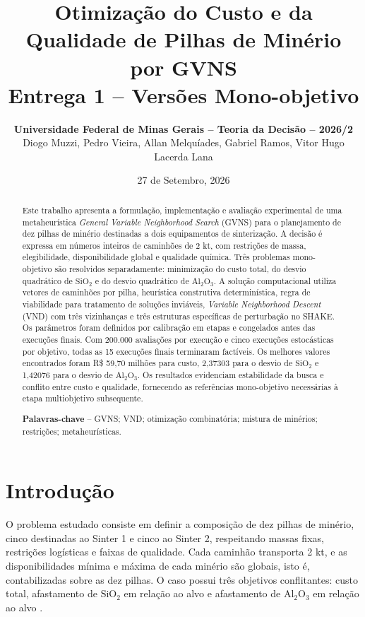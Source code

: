 \documentclass[10pt,twocolumn,a4paper]{article}
\title{\LARGE \textbf{Otimização do Custo e da Qualidade de Pilhas de Minério por GVNS}\\[0.3em]
\large Entrega 1 -- Versões Mono-objetivo}
\author{\textbf{Universidade Federal de Minas Gerais -- Teoria da Decisão -- 2026/2}\\[0.2em]
\small Diogo Muzzi, Pedro Vieira, Allan Melquíades, Gabriel Ramos, Vitor Hugo Lacerda Lana}
\date{27 de Setembro, 2026}
\begin{document}
\maketitle

\begin{abstract}
\noindent Este trabalho apresenta a formulação, implementação e avaliação experimental de uma metaheurística \textit{General Variable Neighborhood Search} (GVNS) para o planejamento de dez pilhas de minério destinadas a dois equipamentos de sinterização. A decisão é expressa em números inteiros de caminhões de 2 kt, com restrições de massa, elegibilidade, disponibilidade global e qualidade química. Três problemas mono-objetivo são resolvidos separadamente: minimização do custo total, do desvio quadrático de $\text{SiO}_2$ e do desvio quadrático de $\text{Al}_2\text{O}_3$. A solução computacional utiliza vetores de caminhões por pilha, heurística construtiva determinística, regra de viabilidade para tratamento de soluções inviáveis, \textit{Variable Neighborhood Descent} (VND) com três vizinhanças e três estruturas específicas de perturbação no SHAKE. Os parâmetros foram definidos por calibração em etapas e congelados antes das execuções finais. Com 200.000 avaliações por execução e cinco execuções estocásticas por objetivo, todas as 15 execuções finais terminaram factíveis. Os melhores valores encontrados foram R\$ 59,70 milhões para custo, 2,37303 para o desvio de $\text{SiO}_2$ e 1,42076 para o desvio de $\text{Al}_2\text{O}_3$. Os resultados evidenciam estabilidade da busca e conflito entre custo e qualidade, fornecendo as referências mono-objetivo necessárias à etapa multiobjetivo subsequente.

\vspace{0.3em}
\noindent\textbf{Palavras-chave} -- GVNS; VND; otimização combinatória; mistura de minérios; restrições; metaheurísticas.
\end{abstract}

\section{Introdução}

O problema estudado consiste em definir a composição de dez pilhas de minério, cinco destinadas ao Sinter 1 e cinco ao Sinter 2, respeitando massas fixas, restrições logísticas e faixas de qualidade. Cada caminhão transporta 2 kt, e as disponibilidades mínima e máxima de cada minério são globais, isto é, contabilizadas sobre as dez pilhas. O caso possui três objetivos conflitantes: custo total, afastamento de $\text{SiO}_2$ em relação ao alvo e afastamento de $\text{Al}_2\text{O}_3$ em relação ao alvo \cite{case_enunciado}.
\end{document}
